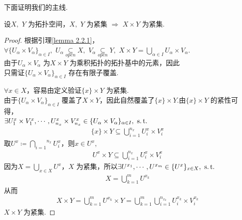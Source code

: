 	\newpage
	下面证明我们的主线.
	\begin{proposition}\label{prop 2.2.1}
		设$X , \,\, Y$ 为拓扑空间，$X , \,\, Y$ 为紧集 $\Rightarrow$ $X \times Y$ 为紧集.
		
		\vspace*{2em}
		\begin{proof}
			根据引理\ref{lemma 2.2.1}，$\forall \{ U_\alpha \times V_\alpha \}_{\alpha \in I} , \,\, U_\alpha \underset{open}{\subseteq} X , \,\, V_\alpha \underset{open}{\subseteq} Y , \,\, X \times Y = \underset{\alpha \in I}{\bigcup}{U_\alpha \times V_\alpha}$.\\
			由于$U_\alpha \times V_\alpha$ 为$X \times Y$ 为乘积拓扑的拓扑基中的元素，因此\\
			只需证$\{ U_\alpha \times V_\alpha \}_{\alpha \in I}$ 存在有限子覆盖.
			
			\vspace*{1em}
			$\forall x \in X$，容易由定义验证$\{ x \} \times Y$ 为紧集.\\
			由于$\{ U_\alpha \times V_\alpha \}_{\alpha \in I}$ 覆盖了$X \times Y$，因此自然覆盖了$\{ x \} \times Y$.由$\{ x \} \times Y$ 的紧性可得，\\
			$\exists U_{1}^{x} \times V_{1}^{x} , \cdots , U_{n_x}^{x} \times V_{n_x}^{x} \in \{ U_\alpha \times V_\alpha \}_{\alpha \in I} , \,\, \operatorname{s.t.}$
			\begin{align}
				\{ x \} \times Y \subseteq \bigcup_{i = 1}^{n_x}{U_{i}^{x} \times V_{i}^{x}}
			\end{align}
			取$U^{x} \coloneqq \overset{n_x}{\underset{i = 1}{\bigcap}}{U_{i}^{x}}$，则$x \in U^x , $
			\begin{align}
				U^x \times Y \subseteq \bigcup_{i = 1}^{n_x}{U_{i}^{x} \times V_{i}^{x}}
			\end{align}
			因为$X = \underset{x \in X}{\bigcup}{U^x}$，$X$ 为紧集，所以$\exists U^{x_1} , \cdots , U^{x_m} \in \{ U^x \}_{x \in X} , \,\, \operatorname{s.t.}$
			\begin{align}
				X = \bigcup_{k = 1}^{m}{U^{x_k}}
			\end{align}
			从而
			\begin{align}
				X \times Y 
				= \bigcup_{k = 1}^{m}{U^{x_k} \times Y} 
				=  \bigcup_{k = 1}^{m}{\bigcup_{i = 1}^{n_{x_k}}{U_{i}^{x_k} \times V_{i}^{x_k}}}
			\end{align}
			$X \times Y$ 为紧集.
		\end{proof}
	\end{proposition}

\newpage
